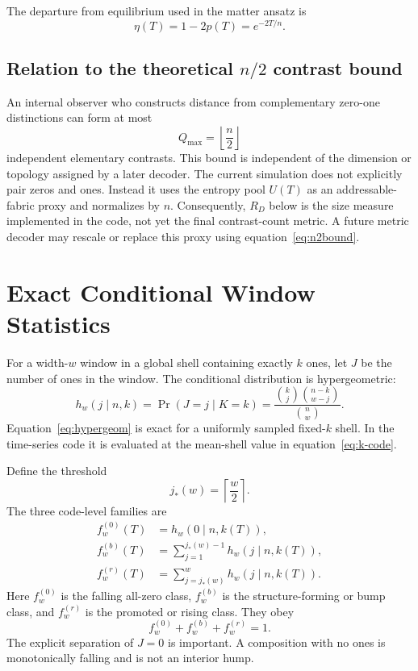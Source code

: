 \documentclass[11pt]{article}
\begin{document}
The departure from equilibrium used in the matter ansatz is
\begin{equation}
 \eta(T)=1-2p(T)=e^{-2T/n}.
 \label{eq:eta}
\end{equation}

\subsection{Relation to the theoretical $n/2$ contrast bound}

An internal observer who constructs distance from complementary zero-one
distinctions can form at most
\begin{equation}
 Q_{\max}=\left\lfloor\frac n2\right\rfloor
 \label{eq:n2bound}
\end{equation}
independent elementary contrasts.  This bound is independent of the
dimension or topology assigned by a later decoder.  The current simulation
does not explicitly pair zeros and ones.  Instead it uses the entropy pool
$U(T)$ as an addressable-fabric proxy and normalizes by $n$.  Consequently,
$R_D$ below is the size measure implemented in the code, not yet the final
contrast-count metric.  A future metric decoder may rescale or replace this
proxy using equation~\eqref{eq:n2bound}.

\section{Exact Conditional Window Statistics}
\label{sec:windows}

For a width-$w$ window in a global shell containing exactly $k$ ones, let
$J$ be the number of ones in the window.  The conditional distribution is
hypergeometric:
\begin{equation}
 h_w(j\mid n,k)
 =\Pr(J=j\mid K=k)
 =\frac{\binom{k}{j}\binom{n-k}{w-j}}{\binom{n}{w}}.
 \label{eq:hypergeom}
\end{equation}
Equation~\eqref{eq:hypergeom} is exact for a uniformly sampled fixed-$k$
shell.  In the time-series code it is evaluated at the mean-shell value in
equation~\eqref{eq:k-code}.

Define the threshold
\begin{equation}
 j_*(w)=\left\lceil\frac w2\right\rceil.
 \label{eq:threshold}
\end{equation}
The three code-level families are
\begin{align}
 f^{(0)}_w(T)
   &=h_w(0\mid n,k(T)),
   \label{eq:fall}\\
 f^{(b)}_w(T)
   &=\sum_{j=1}^{j_*(w)-1}h_w(j\mid n,k(T)),
   \label{eq:bump}\\
 f^{(r)}_w(T)
   &=\sum_{j=j_*(w)}^{w}h_w(j\mid n,k(T)).
   \label{eq:rise}
\end{align}
Here $f^{(0)}_w$ is the falling all-zero class, $f^{(b)}_w$ is the
structure-forming or bump class, and $f^{(r)}_w$ is the promoted or rising
class.
They obey
\begin{equation}
 f^{(0)}_w+f^{(b)}_w+f^{(r)}_w=1.
 \label{eq:family-partition}
\end{equation}
The explicit separation of $J=0$ is important.  A composition with no ones
is monotonically falling and is not an interior hump.
\end{document}
